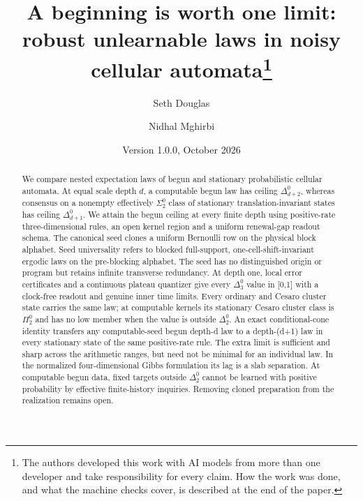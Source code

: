 \documentclass[11pt]{article}
\title{A beginning is worth one limit:\\robust unlearnable laws in noisy cellular automata\thanks{The authors developed this work with AI models from more than one developer and take responsibility for every claim. How the work was done, and what the machine checks cover, is described at the end of the paper.}}
\author{Seth Douglas \and Nidhal Mghirbi}
\date{Version 1.0.0, October 2026}
\theoremstyle{definition}
\begin{document}
\maketitle
\begin{abstract}
We compare nested expectation laws of begun and stationary probabilistic cellular automata. At equal scale depth $d$, a computable begun law has ceiling $\Delta^0_{d+2}$, whereas consensus on a nonempty effectively $\Sigma^0_2$ class of stationary translation-invariant states has ceiling $\Delta^0_{d+1}$. We attain the begun ceiling at every finite depth using positive-rate three-dimensional rules, an open kernel region and a uniform renewal-gap readout schema. The canonical seed clones a uniform Bernoulli row on the physical block alphabet. Seed universality refers to blocked full-support, one-cell-shift-invariant ergodic laws on the pre-blocking alphabet. The seed has no distinguished origin or program but retains infinite transverse redundancy. At depth one, local error certificates and a continuous plateau quantizer give every $\Delta^0_3$ value in [0,1] with a clock-free readout and genuine inner time limits. Every ordinary and Cesaro cluster state carries the same law; at computable kernels its stationary Cesaro cluster class is $\Pi^0_2$ and has no low member when the value is outside $\Delta^0_2$. An exact conditional-cone identity transfers any computable-seed begun depth-d law to a depth-(d+1) law in every stationary state of the same positive-rate rule. The extra limit is sufficient and sharp across the arithmetic ranges, but need not be minimal for an individual law. In the normalized four-dimensional Gibbs formulation its lag is a slab separation. At computable begun data, fixed targets outside $\Delta^0_2$ cannot be learned with positive probability by effective finite-history inquiries. Removing cloned preparation from the realization remains open.
\end{abstract}











\end{document}
